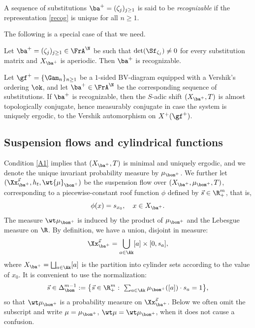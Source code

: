 \begin{defi} \label{def-recog}
A sequence of substitutions $\ba^+ = (\zeta_j)_{j\ge 1}$ is said to be \emph{recognizable} if the representation \eqref{recog} is unique for all $n\ge 1$.
\end{defi}

The following is a special case of \cite[Th.\,4.6]{BSTY} that we need.

\begin{theorem} \label{th-recog0}
Let $\ba^+= (\zeta_j)_{j\ge 1} \in \FrA^\N$ be such that $\det(\Sf_{\zeta_j})\ne 0$ for every substitution matrix and $X_{\ba^+}$ is aperiodic. Then $\ba^+$ is recognizable.
\end{theorem}

\begin{theorem} \label{thm-recog}
Let $\gf^+=\{\Gam_n\}_{n\ge 1}$ be a $1$-sided BV-diagram equipped with a Vershik's ordering $\ok$, and let $\ba^+\in \FrA^\N$ be the corresponding sequence of substitutions.
If $\ba^+$ is recognizable, then the $S$-adic shift $(X_{\ba^+},T)$ is almost topologically conjugate, hence measurably conjugate in case the system is uniquely ergodic, to the
Vershik automorphism on $X^+(\gf^+)$.
\end{theorem}

\subsection{Suspension flows and cylindrical functions}
Condition \eqref{A1} implies that $(X_{\ba^+},T)$ is minimal and uniquely ergodic, and we
denote the unique invariant probability measure by $\mu_{\bom^+}$.
We further let
$(\Xx_{\ba^+}^{\vec{s}}, h_t, \wt{\mu}_{\bom^+})$ be the suspension flow over $(X_{\ba^+},\mu_{\bom^+}, T)$, corresponding to a piecewise-constant roof function $\phi$ defined by \hbox{$\vec{s}\in \R^m_+$}, that is,
\[
\phi(x) = s_{x_0},\quad x\in X_{\ba^+}.
\]
The measure $\wt\mu_{\bom^+}$ is induced by the product of $\mu_{\bom^+}$ and the Lebesgue measure on $\R$.
By definition, we have a union, disjoint in measure:
\[
\Xx_{\ba^+}^{\vec{s}} = \bigcup_{a\in \Ak} [a]\times [0,s_a],
\]
where $X_{\ba^+} = \bigsqcup_{a\in \Ak} [a] $ is the partition into cylinder sets according to the value of $x_0$. It is convenient to use the normalization:
\[\textstyle
\vec{s} \in \Delta^{m-1}_\bom:= \bigl\{\vec s\in \R^m_+: \ \sum_{a\in \Ak} \mu_{\bom^+}([a]) \cdot s_a = 1\bigr\},
\]
so that $\wt \mu_{\bom^+}$ is a probability measure on $\Xx_{\ba^+}^{\vec{s}}$. Below we often omit the subscript and write $\mu = \mu_{\bom^+}$, $\wt\mu = \wt\mu_{\bom^+}$,
when it does not cause a confusion.

